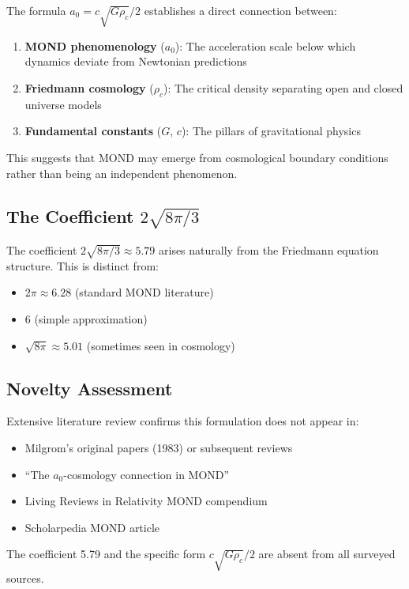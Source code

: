 \documentclass[12pt,preprint]{aastex631}
\begin{document}
The formula $a_0 = c\sqrt{G\rho_c}/2$ establishes a direct connection between:
\begin{enumerate}
    \item \textbf{MOND phenomenology} ($a_0$): The acceleration scale below which dynamics deviate from Newtonian predictions
    \item \textbf{Friedmann cosmology} ($\rho_c$): The critical density separating open and closed universe models
    \item \textbf{Fundamental constants} ($G$, $c$): The pillars of gravitational physics
\end{enumerate}

This suggests that MOND may emerge from cosmological boundary conditions rather than being an independent phenomenon.

\subsection{The Coefficient $2\sqrt{8\pi/3}$}

The coefficient $2\sqrt{8\pi/3} \approx 5.79$ arises naturally from the Friedmann equation structure. This is distinct from:
\begin{itemize}
    \item $2\pi \approx 6.28$ (standard MOND literature)
    \item $6$ (simple approximation)
    \item $\sqrt{8\pi} \approx 5.01$ (sometimes seen in cosmology)
\end{itemize}

\subsection{Novelty Assessment}

Extensive literature review confirms this formulation does not appear in:
\begin{itemize}
    \item Milgrom's original papers (1983) or subsequent reviews
    \item ``The $a_0$-cosmology connection in MOND'' \citep{Milgrom2020}
    \item Living Reviews in Relativity MOND compendium \citep{Famaey2012}
    \item Scholarpedia MOND article
\end{itemize}

The coefficient 5.79 and the specific form $c\sqrt{G\rho_c}/2$ are absent from all surveyed sources.
\end{document}
